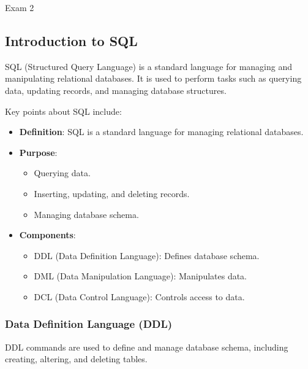\begin{examnotes}{Exam 2}
    \subsection*{Introduction to SQL}
    
    SQL (Structured Query Language) is a standard language for managing and manipulating relational databases. It is used to perform tasks such as querying data, updating records, and managing database structures.
    
    \begin{highlight}
        Key points about SQL include:
        
        \begin{itemize}
            \item \textbf{Definition}: SQL is a standard language for managing relational databases.
            \item \textbf{Purpose}:
                \begin{itemize}
                    \item Querying data.
                    \item Inserting, updating, and deleting records.
                    \item Managing database schema.
                \end{itemize}
            \item \textbf{Components}:
                \begin{itemize}
                    \item DDL (Data Definition Language): Defines database schema.
                    \item DML (Data Manipulation Language): Manipulates data.
                    \item DCL (Data Control Language): Controls access to data.
                \end{itemize}
        \end{itemize}
    \end{highlight}
    
    \subsubsection*{Data Definition Language (DDL)}
    
    DDL commands are used to define and manage database schema, including creating, altering, and deleting tables.
    

\end{examnotes}
